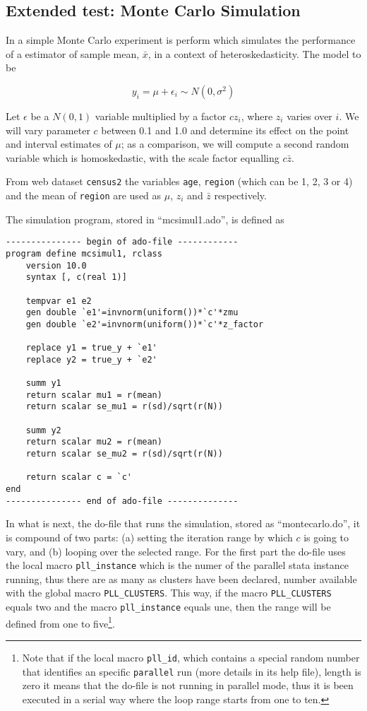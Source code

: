 \documentclass[letterpaper, 10pt]{article}
\begin{document}
\pagebreak

\subsection{Extended test: Monte Carlo Simulation}

In  a simple Monte Carlo experiment is perform which simulates the performance of a estimator of sample mean, $\bar x$, in a context of heteroskedasticity. The model to be

\begin{equation}
y_i = \mu + \epsilon_i \sim N(0,\sigma^2)
\end{equation}

Let $\epsilon$ be a $N(0,1)$ variable multiplied by a factor $cz_i$, where $z_i$ varies over $i$. We will vary parameter $c$ between 0.1 and 1.0 and determine its effect on the point and interval estimates of $\mu$; as a comparison, we will compute a second random variable which is homoskedastic, with the scale factor equalling $c\bar z$.

From web dataset {\tt census2} the variables {\tt age}, {\tt region} (which can be 1, 2, 3 or 4) and the mean of {\tt region} are used as $\mu$, $z_i$ and $\bar z$ respectively.

The simulation program, stored in ``mcsimul1.ado'', is defined as
\bigskip

\begin{Verbatim}[tabsize=4, fontsize=\footnotesize]
--------------- begin of ado-file ------------
program define mcsimul1, rclass
	version 10.0
	syntax [, c(real 1)]
	
	tempvar e1 e2
	gen double `e1'=invnorm(uniform())*`c'*zmu
	gen double `e2'=invnorm(uniform())*`c'*z_factor
	
	replace y1 = true_y + `e1'
	replace y2 = true_y + `e2'
	
	summ y1
	return scalar mu1 = r(mean)
	return scalar se_mu1 = r(sd)/sqrt(r(N))
	
	summ y2
	return scalar mu2 = r(mean)
	return scalar se_mu2 = r(sd)/sqrt(r(N))
	
	return scalar c = `c'
end
--------------- end of ado-file --------------
\end{Verbatim}
\bigskip

In what is next, the do-file that runs the simulation, stored as ``montecarlo.do'', it is compound of two parts: (a) setting the iteration range by which $c$ is going to vary, and (b) looping over the selected range. For the first part the do-file uses the local macro {\tt pll\_instance} which is the numer of the parallel stata instance running, thus there are as many as clusters have been declared, number available with the global macro {\tt PLL\_CLUSTERS}. This way, if the macro {\tt PLL\_CLUSTERS} equals two and the macro {\tt pll\_instance} equals une, then the range will be defined from one to five\footnote{Note that if the local macro {\tt pll\_id}, which contains a special random number that identifies an specific {\tt parallel} run (more details in its help file), length is zero it means that the do-file is not running in parallel mode, thus it is been executed in a serial way where the loop range starts from one to ten.}.
\bigskip
\end{document}
